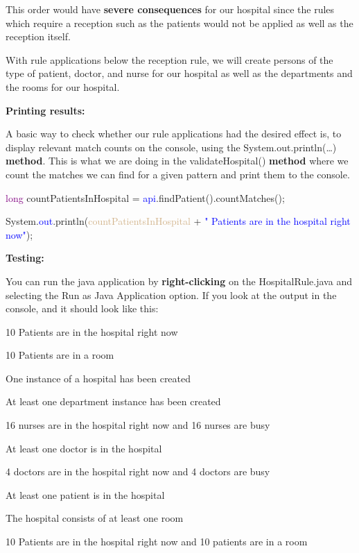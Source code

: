 This order would have \textbf{severe consequences} for our hospital since the rules which require a reception such as the patients would not be applied as well as the reception itself. \newline

With rule applications below the reception rule, we will create persons of the type of patient, doctor, and nurse for our hospital as well as the departments and the rooms for our hospital.\newline

\textbf{Printing results:}

A basic way to check whether our rule applications had the desired effect is, to display relevant match counts on the console, using the \textsf{System.out.println(…)} \textbf{method}. This is what we are doing in the \textsf{validateHospital()} \textbf{method} where we count the matches we can find for a given pattern and print them to the console.\newline

{

\textcolor{Purple}{long} countPatientsInHospital = \textcolor{blue}{api}.findPatient().countMatches();

System.\textcolor{blue}{out}.println(\textcolor{Tan}{countPatientsInHospital} + \textcolor{blue}{" Patients are in the hospital right now"});\newline\newline

}

\clearpage

\textbf{Testing:}

You can run the java application by \textbf{right-clicking} on the \textsf{HospitalRule.java} and selecting the \textsf{Run as Java Application} option. If you look at the output in the console, and it should look like this:\newline

{

\textsf{10 Patients are in the hospital right now}

\textsf{10 Patients are in a room}

\textsf{One instance of a hospital has been created}

\textsf{At least one department instance has been created}

\textsf{16 nurses are in the hospital right now and 16 nurses are busy}

\textsf{At least one doctor is in the hospital}

\textsf{4 doctors are in the hospital right now and 4 doctors are busy}

\textsf{At least one patient is in the hospital}

\textsf{The hospital consists of at least one room}

\textsf{10 Patients are in the hospital right now and 10 patients are in a room}\newline

}

